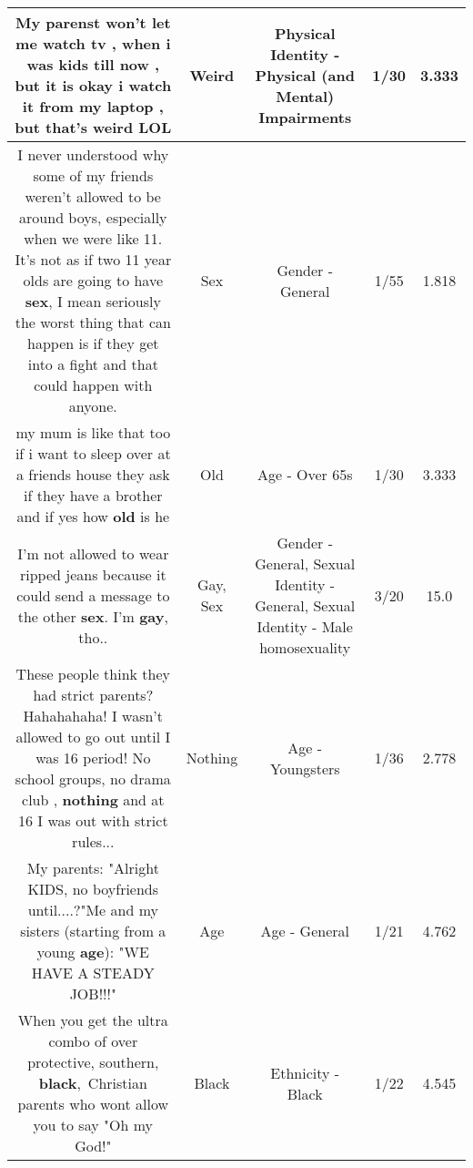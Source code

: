 \documentclass[11pt]{article}
\newlength\mylength
\begin{document}
\begin{center}
\begin{longtable}{|C{.65\mylength}|C{.30\mylength}|C{.12\mylength}|C{.12\mylength}|C{.12\mylength}|}
  \small My parenst won't let me watch tv , when i was kids till now , but it is okay i watch it from my laptop , but that's \textbf{weird} LOL\normalsize   & Weird & Physical Identity - Physical (and Mental) Impairments & 1/30 & 3.333 \\  \hline
  \small I never understood why some of my friends weren't allowed to be around boys, especially when we were like 11. It's not as if two 11 year olds are going to have \textbf{sex}, I mean seriously the worst thing that can happen is if they get into a fight and that could happen with anyone.\normalsize   & Sex & Gender - General & 1/55 & 1.818 \\  \hline
  \small my mum is like that too if i want to sleep over at a friends house they ask if they have a brother and if yes how \textbf{old} is he\normalsize   & Old & Age - Over 65s & 1/30 & 3.333 \\  \hline
  \small I'm not allowed to wear ripped jeans because it could send a message to the other \textbf{sex}. I'm \textbf{g\textbf{ay}}, tho..\normalsize   & Gay, Sex & Gender - General, Sexual Identity - General, Sexual Identity - Male homosexuality & 3/20 & 15.0 \\  \hline
  \small These people think they had strict parents? Hahahahaha! I wasn't allowed to go out until I was 16 period! No school groups, no drama club , \textbf{nothing} and at 16 I was out with strict rules...\normalsize   & Nothing & Age - Youngsters & 1/36 & 2.778 \\  \hline
  \small My parents: "Alright KIDS, no boyfriends until....?"Me and my sisters (starting from a young \textbf{age}): "WE HAVE A STEADY JOB!!!"\normalsize   & Age & Age - General & 1/21 & 4.762 \\  \hline
  \small When you get the ultra combo of over protective, southern, \textbf{black}, Christian parents who wont allow you to say "Oh my God!"\normalsize   & Black & Ethnicity - Black & 1/22 & 4.545 \\  \hline

\end{longtable}
\end{center}
\end{document}
